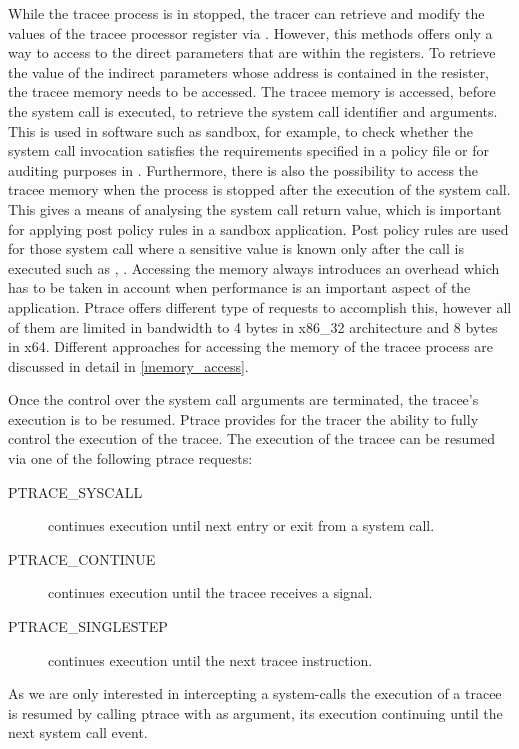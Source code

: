  
While the tracee process is in stopped, the tracer can retrieve and modify the values of the tracee processor register via . However, this methods offers only a way to access to the direct parameters that are within the registers. To retrieve the value of the indirect parameters whose address is contained in the resister, the tracee memory needs to be accessed. The tracee memory is accessed, before the system call is executed, to retrieve the system call identifier and arguments. This is used in software such as sandbox, for example, \cite{Provos02improvinghost,Janus,MapBox, Noordende_asecure} to check whether the system call invocation satisfies the requirements specified in a policy file or for auditing purposes in \cite{strace}. Furthermore, there is also the possibility to access the tracee memory when the process is stopped after the execution of the system call. This gives a means of analysing the system call return value, which is important for applying post policy rules in a sandbox application. Post policy rules are used for those system call where a sensitive value is known only after the call is executed such as , . Accessing the memory always introduces an overhead which has to be taken in account when performance is an important aspect of the application. Ptrace offers different type of requests \cite{ptrace} to accomplish this, however all of them are limited in bandwidth to 4 bytes in x86\_32 architecture and 8 bytes in x64. Different approaches for accessing the memory of the tracee process are discussed in detail in \ref{memory_access}. 

Once the control over the system call arguments are terminated, the tracee's execution is to be resumed. Ptrace provides for the tracer the ability to fully control the execution of the tracee. The execution of the tracee can be resumed via one of the following ptrace requests:

\begin{description}
\item[PTRACE\_SYSCALL] continues execution until next entry or exit from a system call.
\item[PTRACE\_CONTINUE]continues execution until the tracee receives a signal.
\item[PTRACE\_SINGLESTEP] continues execution until the next tracee instruction. 
\end{description}

As we are only interested in intercepting a system-calls the execution of a tracee is resumed by calling ptrace with  as argument, its execution continuing until the next system call event. 



